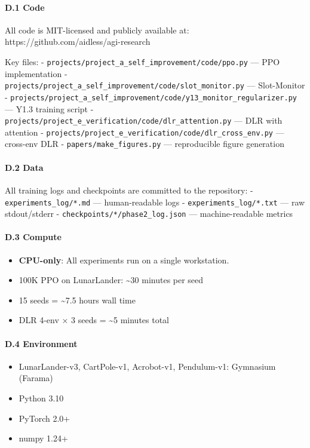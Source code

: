 \documentclass[
]{article}
\providecommand{\tightlist}{%
  \setlength{\itemsep}{0pt}\setlength{\parskip}{0pt}}
\begin{document}
\paragraph{D.1 Code}\label{d.1-code}

All code is MIT-licensed and publicly available at:
https://github.com/aidless/agi-research

Key files: - \texttt{projects/project\_a\_self\_improvement/code/ppo.py}
--- PPO implementation -
\texttt{projects/project\_a\_self\_improvement/code/slot\_monitor.py}
--- Slot-Monitor -
\texttt{projects/project\_a\_self\_improvement/code/y13\_monitor\_regularizer.py}
--- Y1.3 training script -
\texttt{projects/project\_e\_verification/code/dlr\_attention.py} ---
DLR with attention -
\texttt{projects/project\_e\_verification/code/dlr\_cross\_env.py} ---
cross-env DLR - \texttt{papers/make\_figures.py} --- reproducible figure
generation

\paragraph{D.2 Data}\label{d.2-data}

All training logs and checkpoints are committed to the repository: -
\texttt{experiments\_log/*.md} --- human-readable logs -
\texttt{experiments\_log/*.txt} --- raw stdout/stderr -
\texttt{checkpoints/*/phase2\_log.json} --- machine-readable metrics

\paragraph{D.3 Compute}\label{d.3-compute}

\begin{itemize}
\tightlist
\item
  \textbf{CPU-only}: All experiments run on a single workstation.
\item
  100K PPO on LunarLander: \textasciitilde30 minutes per seed
\item
  15 seeds = \textasciitilde7.5 hours wall time
\item
  DLR 4-env × 3 seeds = \textasciitilde5 minutes total
\end{itemize}

\paragraph{D.4 Environment}\label{d.4-environment}

\begin{itemize}
\tightlist
\item
  LunarLander-v3, CartPole-v1, Acrobot-v1, Pendulum-v1: Gymnasium
  (Farama)
\item
  Python 3.10
\item
  PyTorch 2.0+
\item
  numpy 1.24+
\end{itemize}
\end{document}
